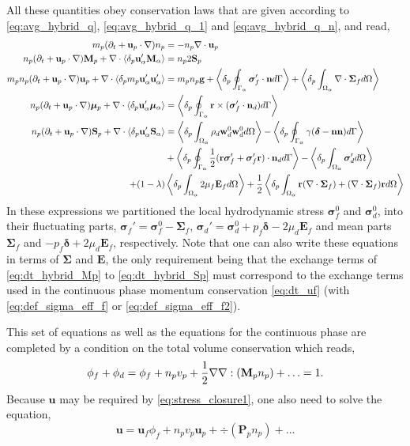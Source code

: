 All these quantities obey conservation laws that are given according to \ref{eq:avg_hybrid_q}, \ref{eq:avg_hybrid_q_1} and \ref{eq:avg_hybrid_q_n}, and read, 
\begin{align}
    m_p(\pddt + \textbf{u}_p \cdot \grad)n_p
    &=
    - n_p \div \textbf{u}_p\\
    n_p (\pddt + \textbf{u}_p \cdot \grad) \textbf{M}_p
    +\div  \pavg{\textbf{u}_\alpha'\textbf{M}_\alpha}
    &=
    n_p2  \textbf{S}_p
    \label{eq:dt_hybrid_Mp}\\
    \label{eq:dt_hybrid_up}
    m_p n_p(\pddt + \textbf{u}_p \cdot \grad)\textbf{u}_p
    + \div \pavg{m_p \textbf{u}_\alpha'\textbf{u}_\alpha'}
    &=
    m_p n_p \textbf{g}
    + \pSavg{\bm\sigma_f' \cdot \textbf{n}}
    + \pOavg{\div\bm\Sigma_f}\\
    \label{eq:dt_hybrid_mup}
    n_p (\pddt + \textbf{u}_p \cdot \grad) \bm{\mu}_p
    +\div  \pavg{\textbf{u}_\alpha'\bm\mu_\alpha}
    &=
    \pSavg{\textbf{r}\times(\bm\sigma_f'\cdot \textbf{n}_d)}
    \\
    \label{eq:dt_hybrid_Sp}
    n_p (\pddt + \textbf{u}_p \cdot \grad) \textbf{S}_p
    +\div  \pavg{\textbf{u}_\alpha'\textbf{S}_\alpha}
    &=
    \pOavg{
        \rho_d \textbf{w}_d^0  \textbf{w}_d^0 
    }
    -  \pSavg{\gamma (\bm\delta - \textbf{nn})}\nonumber\\
    &+\pSavg{\frac{1}{2}(\textbf{r}\bm\sigma_f'+\bm\sigma_f'\textbf{r})\cdot \textbf{n}_d}
    - \pOavg{
        \bm{\sigma}_d'
    }\nonumber \\
    + (1-\lambda)&\pOavg{2\mu_f\textbf{E}_f}
    + \frac{1}{2}\pOavg{\textbf{r}(\div\bm\Sigma_f)+ (\div\bm\Sigma_f) \textbf{r}}
\end{align}
In these expressions we partitioned the local hydrodynamic stress $\bm\sigma_f^0$ and $\bm\sigma_d^0$, into their fluctuating parts, $\bm\sigma_f'=\bm\sigma_f^0 - \bm\Sigma_f$,  $\bm\sigma_d' = \bm\sigma_d^0 + p_f\bm\delta - 2\mu_d \textbf{E}_f$ and mean parts $\bm\Sigma_f$ and $-p_f \bm\delta + 2\mu_d \textbf{E}_f$, respectively. 
Note that one can also write these equations in terms of $\bm\Sigma$ and $\textbf{E}$, the only requirement being that the exchange terms of \ref{eq:dt_hybrid_Mp} to \ref{eq:dt_hybrid_Sp} must correspond to the exchange terms used in the continuous phase momentum conservation \eqref{eq:dt_uf} (with \ref{eq:def_sigma_eff_f} or \ref{eq:def_sigma_eff_f2}). 

This set of equations as well as the equations for the continuous phase are completed by a condition on the total volume conservation which reads, 
\begin{equation}
    \phi_f + \phi_d = 
    \phi_f +  n_pv_p + \frac{1}{2}\grad\grad : (\textbf{M}_p n_p) + \ldots = 1. 
    \label{eq:volume_conservation}
\end{equation}
Because $\textbf{u}$ may be required by \ref{eq:stress_closure1}, one also need to solve the equation, 
\begin{equation}
    \textbf{u} = \textbf{u}_f\phi_f + 
    n_pv_p\textbf{u}_p + \div  (\textbf{P}_p n_p) + \ldots
    \label{eq:velocity_conservation}
\end{equation}

